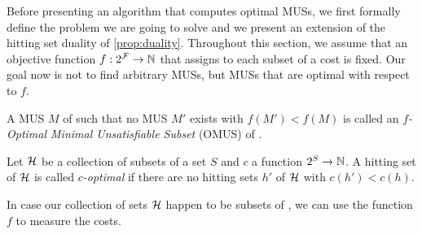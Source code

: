 
Before presenting an algorithm that computes optimal MUSs, we first formally define the problem we are going to solve and we present an extension of the hitting set duality of \cref{prop:duality}. 
Throughout this section, we assume that an objective function $f: 2^{\mathcal{F}}  \to \mathbb{N}$ that assigns to each subset of \formula a cost is fixed. Our goal now is not to find arbitrary MUSs, but MUSs that are optimal with respect to $f$. 



\begin{definition}
  A MUS $M$ of \formula such that no MUS $M'$ exists with $f(M')<f(M)$  is called an \emph{$f$-Optimal Minimal Unsatisfiable Subset} (OMUS) of \formula.
\end{definition}

\begin{definition}
  Let $\mathcal{H}$ be a collection of subsets of a set $S$ and $c$ a function $2^S\to\mathbb{N}$. 
  A hitting set of $\mathcal{H}$ is called \emph{$c$-optimal} if there are no hitting sets $h'$ of $\mathcal{H}$ with $c(h')<c(h)$. 
\end{definition}
In case our collection of sets $\mathcal{H}$ happen to be subsets of \formula, we can use the function $f$ to measure the costs. 
% 


